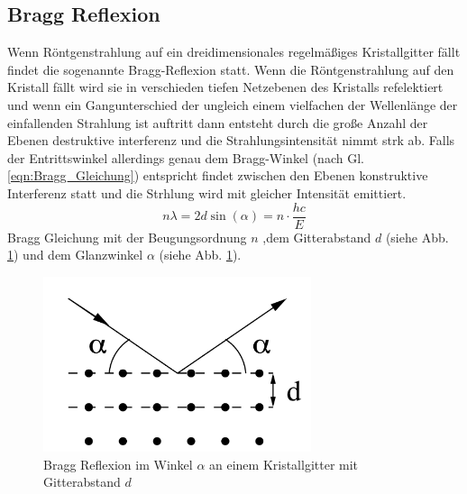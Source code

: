 \subsection{Bragg Reflexion}
Wenn Röntgenstrahlung auf ein dreidimensionales regelmäßiges Kristallgitter fällt findet die sogenannte Bragg-Reflexion statt.
Wenn die Röntgenstrahlung auf den Kristall fällt wird sie in verschieden tiefen Netzebenen des Kristalls refelektiert und wenn ein Gangunterschied der ungleich einem vielfachen der Wellenlänge der einfallenden Strahlung ist auftritt dann entsteht durch die große Anzahl der Ebenen destruktive interferenz und die Strahlungsintensität nimmt strk ab.
Falls der Entrittswinkel allerdings genau dem Bragg-Winkel (nach Gl. \ref{eqn:Bragg_Gleichung}) entspricht findet zwischen den Ebenen konstruktive Interferenz statt und die Strhlung wird mit gleicher Intensität emittiert.
\begin{equation}
    n\lambda = 2 d \sin(\alpha) = n\cdot \frac{hc}{E} \label{eqn:Bragg_Gleichung}
\end{equation}
Bragg Gleichung mit der Beugungsordnung $n$ ,dem Gitterabstand $d$ (siehe Abb. \ref{fig:Bragg_Reflexion}) und dem Glanzwinkel $\alpha$ (siehe Abb. \ref{fig:Bragg_Reflexion}).
\begin{figure}
    \centering
    \includegraphics[width=0.7\textwidth]{bilder/Bragg_Reflexion.png}
    \caption{Bragg Reflexion im Winkel $\alpha$ an einem Kristallgitter mit Gitterabstand $d$ }
    \label{fig:Bragg_Reflexion}
\end{figure}

